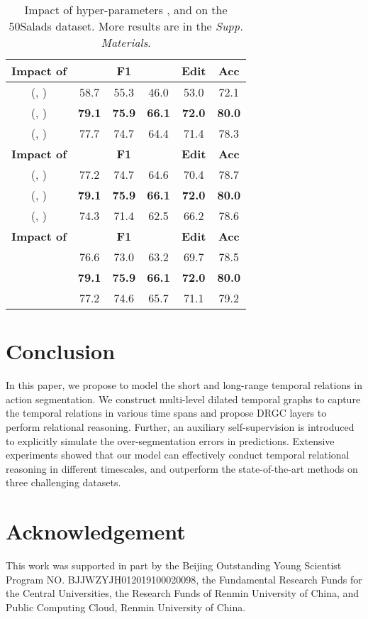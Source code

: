 \documentclass[letterpaper]{article} \usepackage{aaai21}  \usepackage{times}  \usepackage{helvet} \usepackage{courier}  \usepackage[hyphens]{url}  \usepackage{graphicx} \usepackage{mathtools}
\begin{document}
\begin{table}[htbp]
	\centering
	\caption{Impact of hyper-parameters ,  and  on the 50Salads dataset. More results are in the \emph{Supp. Materials}.}
	\vspace{-0.2cm}
	\begin{tabular}{cccccc}
		\hline
		\textbf{Impact of } &\multicolumn{3}{c}{\textbf{F1}} &\textbf{Edit} &\textbf{Acc} \\  
		\hline
		(, ) &58.7 &55.3 &46.0 &53.0 &72.1 \\
		(, ) &\textbf{79.1} &\textbf{75.9} &\textbf{66.1} &\textbf{72.0} &\textbf{80.0} \\
		(, ) &77.7 &74.7 &64.4 &71.4 &78.3 \\
		\hline
		\hline
		\textbf{Impact of } &\multicolumn{3}{c}{\textbf{F1}} &\textbf{Edit} &\textbf{Acc} \\ 
		\hline
		(, ) &77.2 &74.7 &64.6 &70.4 &78.7 \\
		(, ) &\textbf{79.1} &\textbf{75.9} &\textbf{66.1} &\textbf{72.0} &\textbf{80.0} \\
		(, ) &74.3 &71.4 &62.5 &66.2 &78.6 \\
		\hline
		\hline
		\textbf{Impact of } &\multicolumn{3}{c}{\textbf{F1}} &\textbf{Edit} &\textbf{Acc} \\ 
		\hline
		 &76.6 &73.0 &63.2 &69.7 &78.5 \\
		 &\textbf{79.1} &\textbf{75.9} &\textbf{66.1} &\textbf{72.0} &\textbf{80.0} \\
		 &77.2 &74.6 &65.7 &71.1 &79.2 \\
		\hline
	\end{tabular}\label{Table-impact-paras}
\end{table}

\section{Conclusion}
In this paper, we propose to model the short and long-range temporal relations in action segmentation. We construct multi-level dilated temporal graphs to capture the temporal relations in various time spans and propose DRGC layers to perform relational reasoning. Further, an auxiliary self-supervision is introduced to explicitly simulate the over-segmentation errors in predictions. Extensive experiments showed that our model can effectively conduct temporal relational reasoning in different timescales, and outperform the state-of-the-art methods on three challenging datasets.   




\section*{Acknowledgement}
This work was supported in part by the Beijing Outstanding Young Scientist Program NO. BJJWZYJH012019100020098, the Fundamental Research Funds for the Central Universities, the Research Funds of Renmin University of China, and Public Computing Cloud, Renmin University of China.



\end{document}

